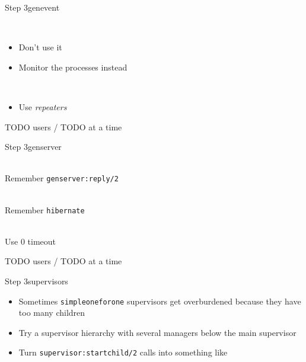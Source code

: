 \documentclass[utf8]{beamer}
\begin{document}
\begin{frame}{Step 3}{gen\textunderscore event}
	\begin{description}
		\item<+->[sup\textunderscore handler]\ \\
			\begin{itemize}
				\item Don't use it
				\item Monitor the processes instead
			\end{itemize}
		\item<+->[Long Delivery Queues]\ \\
			\begin{itemize}
				\item Use \emph{repeaters}
			\end{itemize}
	\end{description}
\end{frame}

\begin{frame}
TODO users / TODO at a time
\end{frame}

\begin{frame}{Step 3}{gen\textunderscore server}
	\begin{description}
		\item<+->[Call Timeouts]\ \\
			Remember \texttt{gen\textunderscore server:reply/2}
		\item<+->[Memory Footprint]\ \\
			Remember \texttt{hibernate}
		\item<+->[Long \texttt{init/1}]\ \\
			Use $0$ timeout
	\end{description}
\end{frame}

\begin{frame}
TODO users / TODO at a time
\end{frame}

\lstset{language=erlang}

\begin{frame}{Step 3}{supervisors}
	\begin{itemize}
		\item Sometimes \texttt{simple\textunderscore one\textunderscore for\textunderscore one} supervisors get \alert{overburdened} because they have too many children
		\item Try a supervisor hierarchy with several managers below the main supervisor
		\item Turn \texttt{supervisor:start\textunderscore child/2} calls into something like
		\startchild
	\end{itemize}
\end{frame}
\end{document}

